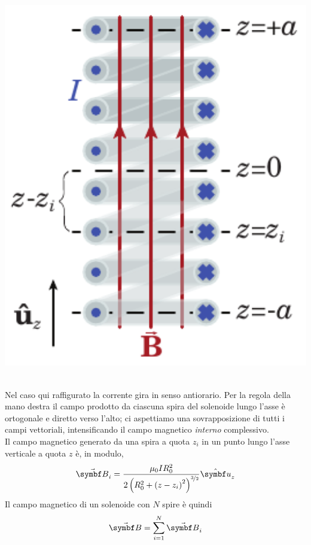 		\begin{minipage}{0.49\textwidth}
			\begin{center}
				\includegraphics[width=1\textwidth]{images/chp8/chp8solenoidecrosssection.pdf}
			\end{center}
		\end{minipage}\\
		Nel caso qui raffigurato la corrente gira in senso antiorario. Per la regola della mano destra il campo prodotto da ciascuna spira del solenoide lungo l'asse è ortogonale e diretto verso l'alto; ci aspettiamo una sovrapposizione di tutti i campi vettoriali, intensificando il campo magnetico \textit{interno} complessivo.\\
		Il campo magnetico generato da una spira a quota $z_i$ in un punto lungo l'asse verticale a quota $z$ è, in modulo,
		\begin{equation*}
			\vba{B}_i=\frac{\mu_0 I R_0^2}{2\left(R_0^2+\left(z-z_i\right)^2\right)^{\nicefrac{3}{2}}}\vbh{u}_z
		\end{equation*}
		Il campo magnetico di un solenoide con $N$ spire è quindi
		\begin{equation*}
			\vba{B}=\sum_{i=1}^{N}\vba{B}_i
		\end{equation*}
